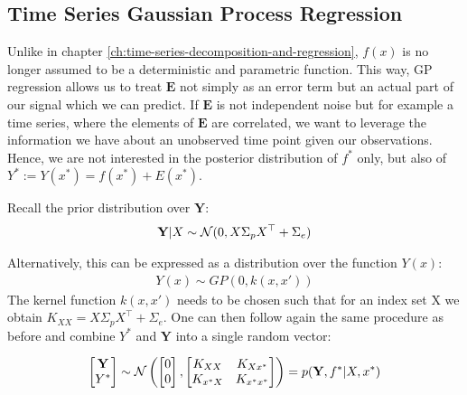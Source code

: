 \subsection{Time Series Gaussian Process Regression}

Unlike in chapter \ref{ch:time-series-decomposition-and-regression}, $f(x)$ is no longer assumed to be a
deterministic and parametric function.
This way, GP regression allows us to treat $\mathbf{E}$ not simply as an error
term but an actual part of our signal which we can predict. If $\mathbf{E}$ is not independent noise but for example a
time series, where the elements of $\mathbf{E}$ are correlated, we want to leverage the information we have about an
unobserved time point given our observations.
Hence, we are not interested in the posterior distribution of $f^{\ast}$ only, but also of
$Y^{\ast} := Y(x^{\ast}) = f(x^{\ast}) + E(x^{\ast})$.

Recall the prior distribution over $\mathbf{Y}$:
\begin{gather*}
    \mathbf{Y}|X \sim \operatorname{\mathcal{N}}(0,  X \Sigma_p X^{\top} + \Sigma_e) \\
\end{gather*}

Alternatively, this can be expressed as a distribution over the function $Y(x)$:
\begin{gather*}
    Y(x) \sim GP(0, k(x, x'))
\end{gather*}
The kernel function $k(x,x')$ needs to be chosen such that for an index set X we obtain $K_{XX} =  X \Sigma_p X^{\top} + \Sigma_e$.
One can then follow again the same procedure as before and combine $Y^{\ast}$ and $\mathbf{Y}$ into a single random vector:

\begin{gather}
    \begin{bmatrix}
        \mathbf{Y} \\
        Y^{\ast}
    \end{bmatrix}
    \sim \operatorname{\mathcal{N}} \left(
        \begin{bmatrix}
        0 \\
        0
        \end{bmatrix},
        \begin{bmatrix}
        K_{XX} & K_{Xx^{\ast}} \\
        K_{x^{\ast}X} & K_{x^{\ast}x^{\ast}}
        \end{bmatrix}
        \right)
    = p(\mathbf{Y}, f^{\ast}| X, x^{\ast})
\end{gather}

